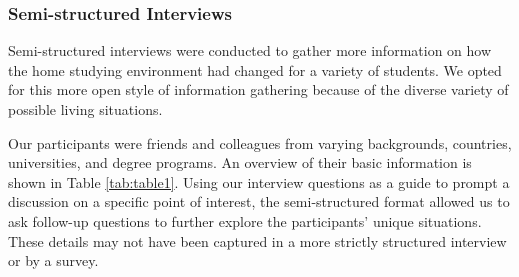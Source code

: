 \documentclass{sigchi}
\begin{document}
\subsubsection{Semi-structured Interviews}
Semi-structured interviews\cite{adams_2015} were conducted to gather more information on how the home studying environment had changed for a variety of students. We opted for this more open style of information gathering because of the diverse variety of possible living situations. 

Our participants were friends and colleagues from varying backgrounds, countries, universities, and degree programs. An overview of their basic information is shown in Table \ref{tab:table1}. Using our interview questions as a guide to prompt a discussion on a specific point of interest, the semi-structured format allowed us to ask follow-up questions to further explore the participants' unique situations. These details may not have been captured in a more strictly structured interview or by a survey.
\end{document}
